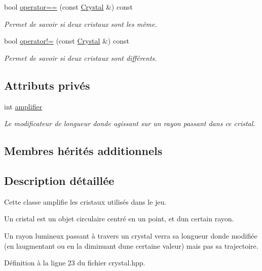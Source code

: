\begin{DoxyCompactItemize}
bool \hyperlink{classCrystal_adeb9d4a8d0d02ff4daccd09650e1b990}{operator==} (const \hyperlink{classCrystal}{Crystal} \&) const 
\begin{DoxyCompactList}\small\item\em Permet de savoir si deux cristaux sont les même. \end{DoxyCompactList}\item 
bool \hyperlink{classCrystal_aa6d486aaf4abc84b0795b75c3e3e598f}{operator!=} (const \hyperlink{classCrystal}{Crystal} \&) const 
\begin{DoxyCompactList}\small\item\em Permet de savoir si deux cristaux sont différents. \end{DoxyCompactList}\end{DoxyCompactItemize}
\subsection*{Attributs privés}
\begin{DoxyCompactItemize}
\item 
int \hyperlink{classCrystal_a6732b62ec55a56f8d29249281e432cc9}{amplifier}
\begin{DoxyCompactList}\small\item\em Le modificateur de longueur d\textquotesingle{}onde agissant sur un rayon passant dans ce cristal. \end{DoxyCompactList}\end{DoxyCompactItemize}
\subsection*{Membres hérités additionnels}


\subsection{Description détaillée}
Cette classe amplifie les cristaux utilisés dans le jeu. 

Un cristal est un objet circulaire centré en un point, et d\textquotesingle{}un certain rayon. 

Un rayon lumineux passant à travers un crystal verra sa longueur d\textquotesingle{}onde modifiée (en l\textquotesingle{}augmentant ou en la diminuant d\textquotesingle{}une certaine valeur) mais pas sa trajectoire. 

Définition à la ligne 23 du fichier crystal.\+hpp.



